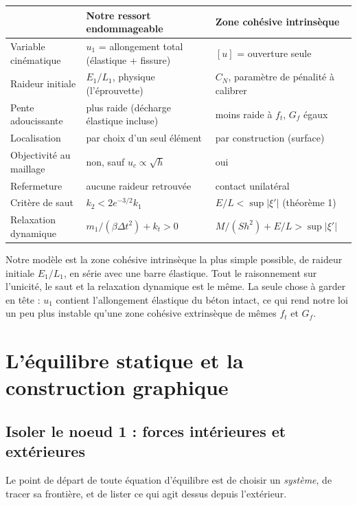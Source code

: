 \documentclass[11pt,a4paper]{article}
\newcommand{\uc}{u_c}
\begin{document}
\begin{center}
\begin{tabular}{@{}p{3.6cm}p{5.2cm}p{5.2cm}@{}}
\toprule
 & Notre ressort endommageable & Zone cohésive intrinsèque\\
\midrule
Variable cinématique & $u_1$ = allongement total (élastique + fissure) & $[u]$ = ouverture seule\\
Raideur initiale & $E_1/L_1$, physique (l'éprouvette) & $C_N$, paramètre de pénalité à calibrer\\
Pente adoucissante & plus raide (décharge élastique incluse) & moins raide à $f_t$, $G_f$ égaux\\
Localisation & par choix d'un seul élément & par construction (surface)\\
Objectivité au maillage & non, sauf $\uc \propto \sqrt h$ & oui\\
Refermeture & aucune raideur retrouvée & contact unilatéral\\
Critère de saut & $k_2 < 2e^{-3/2}k_1$ & $E/L < \sup|\xi'|$ (théorème 1)\\
Relaxation dynamique & $m_1/(\beta\Delta t^2) + k_t > 0$ & $M/(Sh^2) + E/L > \sup|\xi'|$\\
\bottomrule
\end{tabular}
\end{center}

\begin{idee}
Notre modèle est la zone cohésive intrinsèque la plus simple possible, de raideur initiale
$E_1/L_1$, en série avec une barre élastique. Tout le raisonnement sur l'unicité, le saut et
la relaxation dynamique est le même. La seule chose à garder en tête : $u_1$ contient
l'allongement élastique du béton intact, ce qui rend notre loi un peu plus instable qu'une
zone cohésive extrinsèque de mêmes $f_t$ et $G_f$.
\end{idee}

\section{L'équilibre statique et la construction graphique}

\subsection{Isoler le noeud 1 : forces intérieures et extérieures}
Le point de départ de toute équation d'équilibre est de choisir un \emph{système}, de tracer
sa frontière, et de lister ce qui agit dessus depuis l'extérieur.
\end{document}
